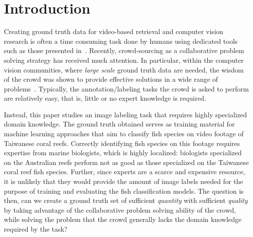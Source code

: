 \section{Introduction}
\label{sec:intro}
Creating ground truth data for video-based retrieval and computer vision research 
is often a time consuming task done by humans using
dedicated tools such as those presented in~\cite{Spam12:vigta}.
%
Recently, crowd-sourcing as a collaborative problem solving strategy has
received much attention.
In particular, within the computer vision communities, where \emph{large scale}
ground truth data are needed, the wisdom of the crowd was shown to
provide effective solutions in a wide range of problems~\cite{Russell08:Label, 
Yuen09:Label, ahnl:04, ahnl06:peekaboom, Chen:2011:LFA}. %
%
Typically, the annotation/labeling tasks the crowd is asked to 
perform are relatively easy, that is, little or no expert knowledge is required. 

Instead, this paper studies an image labeling task that requires
highly specialized domain knowledge. %
The ground truth obtained
serves as training material for machine learning approaches
that aim to classify fish species on video footage of Taiwanese coral
reefs.
Correctly identifying fish species %
on this footage requires expertise from marine biologists, 
which is highly localized: biologists specialized on the
Australian reefs perform not as good as those specialized on the
Taiwanese coral reef fish species.
%
Further, since experts are a scarce and expensive resource, 
it is unlikely that they would provide 
the amount of image labels needed for the purpose
of training and evaluating the fish classification models. 
The question is then, can we create a ground truth set of sufficient \emph{quantity} with sufficient \emph{quality}
by taking advantage of the collaborative problem solving ability of the crowd, %
while solving the problem that the crowd generally lacks the domain knowledge required by the task?

